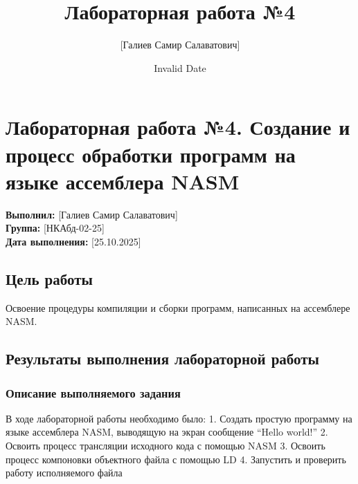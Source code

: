 \documentclass[
  english,
  russian,
  13pt,
  a4paper,
  DIV=11,
  numbers=noendperiod]{scrreprt}
\title{Лабораторная работа №4}
\author{{[}Галиев Самир Салаватович{]}}
\date{Invalid Date}
\renewcommand*\contentsname{Содержание}
\newcommand\contentsname{Содержание}
\begin{document}
\maketitle

\renewcommand*\contentsname{Содержание}
{
\setcounter{tocdepth}{1}
\tableofcontents
}
\listoffigures
\listoftables

\chapter{Лабораторная работа №4. Создание и процесс обработки программ
на языке ассемблера
NASM}\label{ux43bux430ux431ux43eux440ux430ux442ux43eux440ux43dux430ux44f-ux440ux430ux431ux43eux442ux430-4.-ux441ux43eux437ux434ux430ux43dux438ux435-ux438-ux43fux440ux43eux446ux435ux441ux441-ux43eux431ux440ux430ux431ux43eux442ux43aux438-ux43fux440ux43eux433ux440ux430ux43cux43c-ux43dux430-ux44fux437ux44bux43aux435-ux430ux441ux441ux435ux43cux431ux43bux435ux440ux430-nasm}

\textbf{Выполнил:} {[}Галиев Самир Салаватович{]}\\
\textbf{Группа:} {[}НКАбд-02-25{]}\\
\textbf{Дата выполнения:} {[}25.10.2025{]}

\section{Цель
работы}\label{ux446ux435ux43bux44c-ux440ux430ux431ux43eux442ux44b}

Освоение процедуры компиляции и сборки программ, написанных на
ассемблере NASM.

\section{Результаты выполнения лабораторной
работы}\label{ux440ux435ux437ux443ux43bux44cux442ux430ux442ux44b-ux432ux44bux43fux43eux43bux43dux435ux43dux438ux44f-ux43bux430ux431ux43eux440ux430ux442ux43eux440ux43dux43eux439-ux440ux430ux431ux43eux442ux44b}

\subsection{Описание выполняемого
задания}\label{ux43eux43fux438ux441ux430ux43dux438ux435-ux432ux44bux43fux43eux43bux43dux44fux435ux43cux43eux433ux43e-ux437ux430ux434ux430ux43dux438ux44f}

В ходе лабораторной работы необходимо было: 1. Создать простую программу
на языке ассемблера NASM, выводящую на экран сообщение \enquote{Hello
world!} 2. Освоить процесс трансляции исходного кода с помощью NASM 3.
Освоить процесс компоновки объектного файла с помощью LD 4. Запустить и
проверить работу исполняемого файла
\end{document}
